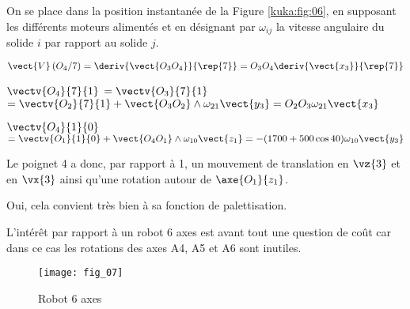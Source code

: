 On se place dans la position instantanée de la Figure \ref{kuka:fig:06}, en supposant les 
différents moteurs alimentés et en désignant par $\omega_{ij}$ la vitesse angulaire du solide $i$ par 
rapport au solide $j$.

\ifprof
\begin{corrige}
$\vect{V}\left(O_4/7\right) = \deriv{\vect{O_3O_4}}{\rep{7}} = O_3 O_4 \deriv{\vect{x_3}}{\rep{7}}$
\end{corrige}
\else
\fi

\ifprof
\begin{corrige}
$\vectv{O_4}{7}{1}$
$=\vectv{O_3}{7}{1}$
$=\vectv{O_2}{7}{1} + \vect{O_3O_2} \wedge \omega_{21} \vect{y_3}=O_2O_3\omega_{21} \vect{x_3}$
\end{corrige}
\else
\fi

\ifprof


\begin{corrige}
$\vectv{O_4}{1}{0}$
$=\vectv{O_1}{1}{0} + \vect{O_4O_1} \wedge \omega_{10} \vect{z_1}=-(1700+500\cos 40) \omega_{10} \vect{y_3}$
\end{corrige}
\else
\fi

\ifprof
\begin{corrige}
Le poignet 4 a donc, par rapport à 1, un mouvement de translation en $\vz{3}$ et en $\vx{3}$ ainsi qu’une 
rotation autour de $\axe{O_1}{z_1}$.
\end{corrige}
\else
\fi

\ifprof
\begin{corrige}
Oui, cela convient très bien à sa fonction de palettisation. 
\end{corrige}
\else
\fi

\ifprof
\begin{corrige}
L’intérêt par rapport à un robot 6 axes est avant tout une question de coût car dans ce cas les 
rotations des axes A4, A5 et A6 sont inutiles.
\end{corrige}
\else
\fi


\ifprof
\else
\begin{figure}[!h]
\centering
\texttt{[image: fig\_07]}
\caption{Robot 6 axes \label{kuka:fig:07}}
\end{figure}
\fi


